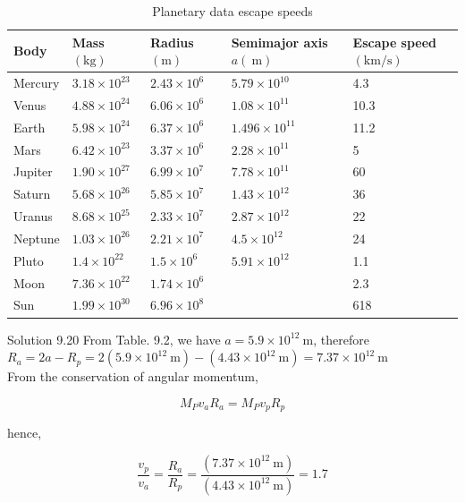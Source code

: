 \documentclass[10pt]{article}
\numberwithin{equation}{section}
\begin{document}
\begin{table}[htbp]
\centering
\begin{tabular}{l|l|l|l|l}
\hline
Body & Mass $(\mathrm{kg})$ & Radius $(\mathrm{m})$ & Semimajor axis $a(\mathrm{~m})$ & Escape speed $(\mathrm{km} / \mathrm{s})$ \\
\hline
Mercury & $3.18 \times 10^{23}$ & $2.43 \times 10^{6}$ & $5.79 \times 10^{10}$ & 4.3 \\
\hline
Venus & $4.88 \times 10^{24}$ & $6.06 \times 10^{6}$ & $1.08 \times 10^{11}$ & 10.3 \\
\hline
Earth & $5.98 \times 10^{24}$ & $6.37 \times 10^{6}$ & $1.496 \times 10^{11}$ & 11.2 \\
\hline
Mars & $6.42 \times 10^{23}$ & $3.37 \times 10^{6}$ & $2.28 \times 10^{11}$ & 5 \\
\hline
Jupiter & $1.90 \times 10^{27}$ & $6.99 \times 10^{7}$ & $7.78 \times 10^{11}$ & 60 \\
\hline
Saturn & $5.68 \times 10^{26}$ & $5.85 \times 10^{7}$ & $1.43 \times 10^{12}$ & 36 \\
\hline
Uranus & $8.68 \times 10^{25}$ & $2.33 \times 10^{7}$ & $2.87 \times 10^{12}$ & 22 \\
\hline
Neptune & $1.03 \times 10^{26}$ & $2.21 \times 10^{7}$ & $4.5 \times 10^{12}$ & 24 \\
\hline
Pluto & $1.4 \times 10^{22}$ & $1.5 \times 10^{6}$ & $5.91 \times 10^{12}$ & 1.1 \\
\hline
Moon & $7.36 \times 10^{22}$ & $1.74 \times 10^{6}$ &  & 2.3 \\
\hline
Sun & $1.99 \times 10^{30}$ & $6.96 \times 10^{8}$ &  & 618 \\
\hline
\end{tabular}
\caption{Planetary data escape speeds}\label{tab:9-2}
\end{table}

Solution 9.20 From Table. 9.2, we have $a=5.9 \times 10^{12} \mathrm{~m}$, therefore\\
$R_{a}=2 a-R_{p}=2\left(5.9 \times 10^{12} \mathrm{~m}\right)-\left(4.43 \times 10^{12} \mathrm{~m}\right)=7.37 \times 10^{12} \mathrm{~m}$\\
From the conservation of angular momentum,

$$
M_{P} v_{a} R_{a}=M_{P} v_{p} R_{p}
$$

hence,

$$
\frac{v_{p}}{v_{a}}=\frac{R_{a}}{R_{p}}=\frac{\left(7.37 \times 10^{12} \mathrm{~m}\right)}{\left(4.43 \times 10^{12} \mathrm{~m}\right)}=1.7
$$
\end{document}
